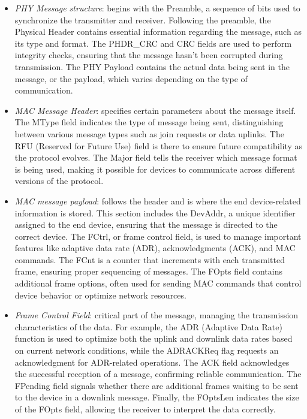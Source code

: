\begin{itemize}
    \item \textit{PHY Message structure}: begins with the Preamble, a sequence of bits used to synchronize the transmitter and receiver.
        Following the preamble, the Physical Header contains essential information regarding the message, such as its type and format. 
        The PHDR\_CRC and CRC fields are used to perform integrity checks, ensuring that the message hasn't been corrupted during transmission. 
        The PHY Payload contains the actual data being sent in the message, or the payload, which varies depending on the type of communication.
    \item \textit{MAC Message Header}: specifies certain parameters about the message itself. 
        The MType field indicates the type of message being sent, distinguishing between various message types such as join requests or data uplinks. 
        The RFU (Reserved for Future Use) field is there to ensure future compatibility as the protocol evolves. 
        The Major field tells the receiver which message format is being used, making it possible for devices to communicate across different versions of the protocol.
    \item \textit{MAC message payload}: follows the header and is where the end device-related information is stored. 
        This section includes the DevAddr, a unique identifier assigned to the end device, ensuring that the message is directed to the correct device. 
        The FCtrl, or frame control field, is used to manage important features like adaptive data rate (ADR), acknowledgments (ACK), and MAC commands. 
        The FCnt is a counter that increments with each transmitted frame, ensuring proper sequencing of messages. 
        The FOpts field contains additional frame options, often used for sending MAC commands that control device behavior or optimize network resources.
    \item \textit{Frame Control Field}: critical part of the message, managing the transmission characteristics of the data.
        For example, the ADR (Adaptive Data Rate) function is used to optimize both the uplink and downlink data rates based on current network conditions, while the ADRACKReq flag requests an acknowledgment for ADR-related operations. 
        The ACK field acknowledges the successful reception of a message, confirming reliable communication.
        The FPending field signals whether there are additional frames waiting to be sent to the device in a downlink message. 
        Finally, the FOptsLen indicates the size of the FOpts field, allowing the receiver to interpret the data correctly.
\end{itemize}

